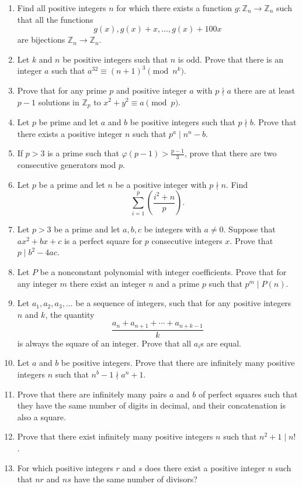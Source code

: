 \documentclass{article}
\newcommand\Zz{\mathbb{Z}}
\begin{document}
\begin{enumerate}
  \item Find all positive integers $n$ for which there exists a function
    $g:\Zz_n\to\Zz_n$ such that all the functions
    \[g(x),g(x)+x,\ldots,g(x)+100x\]
    are bijections $\Zz_n\to\Zz_n$.
  \item Let $k$ and $n$ be positive integers such that $n$ is odd. Prove that
    there is an integer $a$ such that $a^{32}\equiv(n+1)^3\pmod{n^k}$.
  \item Prove that for any prime $p$ and positive integer $a$ with $p\nmid a$
    there are at least $p-1$ solutions in $\Zz_p$ to $x^2+y^2\equiv a\pmod p$.
  \item Let $p$ be prime and let $a$ and $b$ be positive integers such that
    $p\nmid b$. Prove that there exists a positive integer $n$ such that
    $p^a\mid n^n-b$.
  \item If $p>3$ is a prime such that $\varphi(p-1)>\frac{p-1}3$, prove that
    there are two consecutive generators mod $p$.
  \item Let $p$ be a prime and let $n$ be a positive integer with $p\nmid n$.
    Find \[\sum_{i=1}^p\left(\frac{i^2+n}p\right).\]
  \item Let $p>3$ be a prime and let $a,b,c$ be integers with $a\ne 0$. Suppose
    that $ax^2+bx+c$ is a perfect square for $p$ consecutive integers $x$. Prove
    that $p\mid b^2-4ac$.
  \item Let $P$ be a nonconstant polynomial with integer coefficients. Prove that for any
    integer $m$ there exist an integer $n$ and a prime $p$ such that $p^m\mid
    P(n)$.
  \item Let $a_1,a_2,a_3,\ldots$ be a sequence of integers, such that for any
    positive integers $n$ and $k$, the quantity
    \[\frac{a_n+a_{n+1}+\cdots+a_{n+k-1}}k\]
    is always the square of an integer. Prove that all $a_i$s are equal.
  \item Let $a$ and $b$ be positive integers. Prove that there are infinitely
    many positive integers $n$ such that $n^b-1\nmid a^n+1$.
  \item Prove that there are infinitely many pairs $a$ and $b$ of perfect
    squares such that they have the same number of digits in decimal, and their
    concatenation is also a square.
  \item Prove that there exist infinitely many positive integers $n$ such that
    $n^2+1\mid n!$.
  \item For which positive integers $r$ and $s$ does there exist a positive
    integer $n$ such that $nr$ and $ns$ have the same number of divisors?

\end{enumerate}
\end{document}
